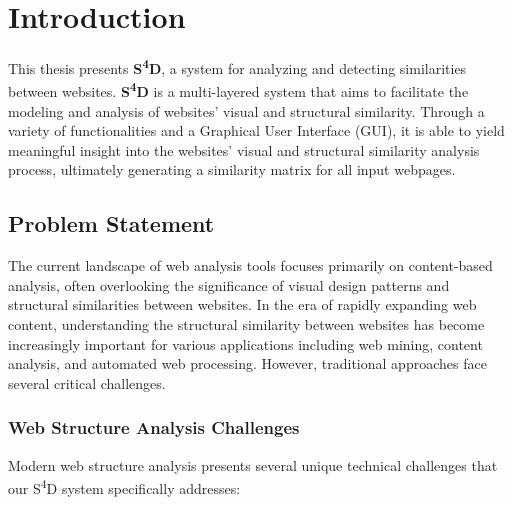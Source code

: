 \chapter{Introduction}
\label{ch:introduction}

This thesis presents \textlatin{\textbf{S\textsuperscript{4}D}}, a system for analyzing and detecting similarities between websites. \textlatin{\textbf{S\textsuperscript{4}D}} is a multi-layered system that aims to facilitate the modeling and analysis of websites' visual and structural similarity. Through a variety of functionalities and a Graphical User Interface (GUI), it is able to yield meaningful insight into the websites' visual and structural similarity analysis process, ultimately generating a similarity matrix for all input webpages.

\section{Problem Statement}
\label{sec:problem-statement}

The current landscape of web analysis tools focuses primarily on content-based analysis, often overlooking the significance of visual design patterns and structural similarities between websites. In the era of rapidly expanding web content, understanding the structural similarity between websites has become increasingly important for various applications including web mining, content analysis, and automated web processing. However, traditional approaches face several critical challenges.

\subsection{Web Structure Analysis Challenges}
\label{subsec:web-challenges}

Modern web structure analysis presents several unique technical challenges that our \textlatin{S\textsuperscript{4}D} system specifically addresses:


